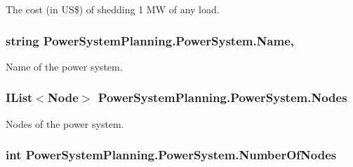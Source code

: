 The cost (in US\$) of shedding 1 MW of any load. 

\subsubsection[{\texorpdfstring{Name}{Name}}]{\setlength{\rightskip}{0pt plus 5cm}string Power\+System\+Planning.\+Power\+System.\+Name\hspace{0.3cm}{\ttfamily [get]}, {\ttfamily [set]}}\hypertarget{class_power_system_planning_1_1_power_system_ae511d3a9d7c871726037041b9fdabe14}{}\label{class_power_system_planning_1_1_power_system_ae511d3a9d7c871726037041b9fdabe14}


Name of the power system. 

\subsubsection[{\texorpdfstring{Nodes}{Nodes}}]{\setlength{\rightskip}{0pt plus 5cm}I\+List$<${\bf Node}$>$ Power\+System\+Planning.\+Power\+System.\+Nodes\hspace{0.3cm}{\ttfamily [get]}}\hypertarget{class_power_system_planning_1_1_power_system_aa51d9c68a12cae03acd530e9ceff58f9}{}\label{class_power_system_planning_1_1_power_system_aa51d9c68a12cae03acd530e9ceff58f9}


Nodes of the power system. 

\subsubsection[{\texorpdfstring{Number\+Of\+Nodes}{NumberOfNodes}}]{\setlength{\rightskip}{0pt plus 5cm}int Power\+System\+Planning.\+Power\+System.\+Number\+Of\+Nodes\hspace{0.3cm}{\ttfamily [get]}}\hypertarget{class_power_system_planning_1_1_power_system_a3d7abefe87bb1621c5d61644b83ae3d5}{}\label{class_power_system_planning_1_1_power_system_a3d7abefe87bb1621c5d61644b83ae3d5}


